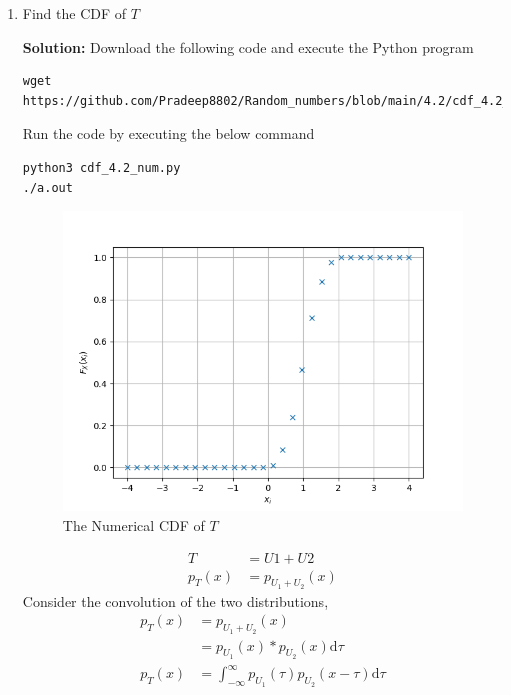 \documentclass[journal,12pt,twocolumn]{IEEEtran}
\newcommand{\solution}{\noindent \textbf{Solution: }}
\providecommand{\der}[1]{\mathrm{d} #1}
\numberwithin{equation}{section}
\renewcommand\thesection{\arabic{section}}
\begin{document}
\begin{enumerate}[label=\thesection.\arabic*,ref=\thesection.\theenumi]
\begin{enumerate}[label=\thesection.\arabic*,ref=\thesection.\theenumi]
	\item Find the CDF of $T$
	
\solution Download the following code and execute the Python program
	\begin{lstlisting}
wget https://github.com/Pradeep8802/Random_numbers/blob/main/4.2/cdf_4.2_num.py
	\end{lstlisting}
	Run the code by executing the below command
	\begin{lstlisting}
python3 cdf_4.2_num.py 
./a.out
	\end{lstlisting}		
 \begin{figure}
		\centering
		\includegraphics[width=\columnwidth]{../figs/cdf_4.2_num.png}
		\caption{The Numerical CDF of $T$}
	\end{figure}
 
 \begin{align}
T&=U1+U2\\
p_T(x) &= p_{U_1 + U_2}(x) 
 \end{align}
 Consider the convolution of the two distributions,
 \begin{align}
p_T(x) &= p_{U_1 + U_2}(x) \\
&= p_{U_1}(x) * p_{U_2}(x) \der{\tau}\\
    p_T(x) &= \int_{-\infty}^{\infty}p_{U_1}(\tau)p_{U_2}(x - \tau) \der{\tau}
    \end{align}
    

\end{enumerate}
\end{enumerate}
\end{document}
